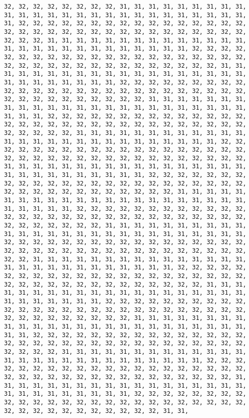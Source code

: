 \documentclass[
]{book}
\begin{document}
\begin{verbatim}
32, 32, 32, 32, 32, 32, 32, 32, 31, 31, 31, 31, 31, 31, 31, 31, 31, 31, 31, 31, 31, 31, 31, 31, 31, 31, 31, 31, 31, 31, 31, 31, 31, 31, 31, 32, 32, 32, 32, 32, 32, 32, 32, 32, 32, 32, 32, 32, 32, 32, 32, 32, 32, 32, 32, 32, 32, 32, 32, 32, 32, 32, 32, 32, 32, 32, 32, 32, 32, 32, 32, 31, 31, 31, 31, 31, 31, 31, 31, 31, 31, 31, 31, 31, 31, 31, 31, 31, 31, 31, 31, 31, 31, 31, 31, 31, 31, 31, 32, 32, 32, 32, 32, 32, 32, 32, 32, 32, 32, 32, 32, 32, 32, 32, 32, 32, 32, 32, 32, 32, 32, 32, 32, 32, 32, 32, 32, 32, 32, 32, 32, 32, 32, 32, 31, 31, 31, 31, 31, 31, 31, 31, 31, 31, 31, 31, 31, 31, 31, 31, 31, 31, 31, 31, 31, 31, 31, 31, 31, 31, 31, 32, 32, 32, 32, 32, 32, 32, 32, 32, 32, 32, 32, 32, 32, 32, 32, 32, 32, 32, 32, 32, 32, 32, 32, 32, 32, 32, 32, 32, 32, 32, 32, 32, 32, 32, 32, 31, 31, 31, 31, 31, 31, 31, 31, 31, 31, 31, 31, 31, 31, 31, 31, 31, 31, 31, 31, 31, 31, 31, 31, 31, 31, 31, 32, 32, 32, 32, 32, 32, 32, 32, 32, 32, 32, 32, 32, 32, 32, 32, 32, 32, 32, 32, 32, 32, 32, 32, 32, 32, 32, 32, 32, 32, 32, 32, 32, 32, 32, 32, 31, 31, 31, 31, 31, 31, 31, 31, 31, 31, 31, 31, 31, 31, 31, 31, 31, 31, 31, 31, 31, 31, 31, 31, 31, 31, 31, 32, 32, 32, 32, 32, 32, 32, 32, 32, 32, 32, 32, 32, 32, 32, 32, 32, 32, 32, 32, 32, 32, 32, 32, 32, 32, 32, 32, 32, 32, 32, 32, 32, 32, 32, 32, 31, 31, 31, 31, 31, 31, 31, 31, 31, 31, 31, 31, 31, 31, 31, 31, 31, 31, 31, 31, 31, 31, 31, 31, 31, 31, 31, 32, 32, 32, 32, 32, 32, 32, 32, 32, 32, 32, 32, 32, 32, 32, 32, 32, 32, 32, 32, 32, 32, 32, 32, 32, 32, 32, 32, 32, 32, 32, 32, 32, 32, 32, 32, 31, 31, 31, 31, 31, 31, 31, 31, 31, 31, 31, 31, 31, 31, 31, 31, 31, 31, 31, 31, 31, 31, 31, 31, 31, 31, 31, 32, 32, 32, 32, 32, 32, 32, 32, 32, 32, 32, 32, 32, 32, 32, 32, 32, 32, 32, 32, 32, 32, 32, 32, 32, 32, 32, 32, 32, 32, 32, 32, 32, 32, 32, 32, 31, 31, 31, 31, 31, 31, 31, 31, 31, 31, 31, 31, 31, 31, 31, 31, 31, 31, 31, 31, 31, 31, 31, 31, 31, 31, 31, 32, 32, 32, 32, 32, 32, 32, 32, 32, 32, 32, 32, 32, 32, 32, 32, 32, 32, 32, 32, 32, 32, 32, 32, 32, 32, 32, 32, 32, 32, 32, 32, 32, 32, 32, 32, 31, 31, 31, 31, 31, 31, 31, 31, 31, 31, 31, 31, 31, 31, 31, 31, 31, 31, 31, 31, 31, 31, 31, 31, 31, 31, 31, 32, 32, 32, 32, 32, 32, 32, 32, 32, 32, 32, 32, 32, 32, 32, 32, 32, 32, 32, 32, 32, 32, 32, 32, 32, 32, 32, 32, 32, 32, 32, 32, 32, 32, 32, 32, 31, 31, 31, 31, 31, 31, 31, 31, 31, 31, 31, 31, 31, 31, 31, 31, 31, 31, 31, 31, 31, 31, 31, 31, 31, 31, 31, 32, 32, 32, 32, 32, 32, 32, 32, 32, 32, 32, 32, 32, 32, 32, 32, 32, 32, 32, 32, 32, 32, 32, 32, 32, 32, 32, 32, 32, 32, 32, 32, 32, 32, 32, 32, 31, 31, 31, 31, 31, 31, 31, 31, 31, 31, 31, 31, 31, 31, 31, 31, 31, 31, 31, 31, 31, 31, 31, 31, 31, 31, 31, 32, 32, 32, 32, 32, 32, 32, 32, 32, 32, 32, 32, 32, 32, 32, 32, 32, 32, 32, 32, 32, 32, 32, 32, 32, 32, 32, 32, 32, 32, 32, 32, 32, 32, 32, 32, 31, 31, 31, 31, 31, 31, 31, 31, 31, 31, 31, 31, 31, 31, 31, 31, 31, 31, 31, 31, 31, 31, 31, 31, 31, 31, 31, 32, 32, 32, 32, 32, 32, 32, 32, 32, 32, 32, 32, 32, 32, 32, 32, 32, 32, 32, 32, 32, 32, 32, 32, 32, 32, 32, 32, 32, 32, 32, 32, 32, 32, 32, 32, 31, 31, 31, 31, 31, 31, 31, 31, 31, 31, 31, 31, 31, 31, 31, 31, 31, 31, 31, 31, 31, 31, 31, 31, 31, 31, 31, 32, 32, 32, 32, 32, 32, 32, 32, 32, 32, 32, 32, 32, 32, 32, 32, 32, 32, 32, 32, 32, 32, 32, 32, 32, 32, 32, 32, 32, 32, 32, 32, 32, 32, 32, 32, 31, 31, 
\end{verbatim}
\end{document}
